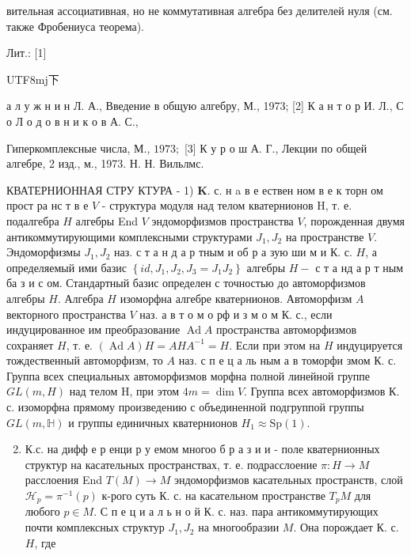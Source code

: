 \documentclass[10pt]{article}
\begin{document}
вительная ассоциативная, но не коммутативная алгебра без делителей нуля (см. также Фробениуса теорема).



Лит.: [1]\begin{CJK}{UTF8}{mj}下\end{CJK} а л у ж н и н Л. А., Введение в общую алгебру, М., 1973; [2] К а н т о р И. Л., С о Л о д о в н и к о в А. С.,

Гиперкомплексные числа, М., $1973 ;$ [3] К у р о ш А. Г., Лекции по общей алгебре, 2 изд., м., 1973. Н. Н. Вильлмс.



КВАТЕРНИОННАЯ СТРУ КТУРА - 1) $\boldsymbol{K}$. с. н a в е ествен ном в е к торн ом прост ра нс т в е $V$ - структура модуля над телом кватернионов $\mathrm{H}$, т. е. подалгебра $H$ алгебры End $V$ эндоморфизмов пространства $V$, порожденная двумя антикоммутирующими комплексными структурами $J_{1}, J_{2}$ на пространстве $V$. Эндоморфизмы $J_{1}, J_{2}$ наз. с т а н д а р тным и об р а зую ши м и К. с. $H$, а определяемый ими базис $\left\{i d, J_{1}, J_{2}, J_{3}=J_{1} J_{2}\right\}$ алгебры $H-$ с т а нд а р т ным ба з и с ом. Стандартный базис определен с точностью до автоморфизмов алгебры $H$. Алгебра $H$ изоморфна алгебре кватернионов. Автоморфизм $A$ векторного пространства $V$ наз. а в т о м о рф и з м о м К. с., если индуцированное им преобразование $\operatorname{Ad} A$ пространства автоморфизмов сохраняет $H$, т. е. $(\operatorname{Ad} A) H=A H A^{-1}=H$. Если при этом на $H$ индуцируется тождественный автоморфизм, то $A$ наз. с п е ц а ль ным а в томорфи змом К. с. Группа всех специальных автоморфизмов морфна полной линейной группе $G L(m, H)$ над телом H, при этом $4 m=\operatorname{dim} V$. Группа всех автоморфизмов К. с. изоморфна прямому произведению с объединенной подгруппой группы $G L(m, \mathbb{H})$ и группы единичных кватернионов $H_{1} \approx \mathrm{Sp}(1)$.



\begin{enumerate}

  \setcounter{enumi}{1}

  \item К.с. на дифф е р енци р у емом многоо б р а з и и - поле кватернионных структур на касательных пространствах, т. е. подрасслоение $\pi: H \rightarrow M$ расслоения End $T(M) \rightarrow M$ эндоморфизмов касательных пространств, слой $\mathscr{H}_{p}=\pi^{-1}(p)$ к-рого суть К. с. на касательном пространстве $T_{p} M$ для любого $p \in M$. С п е ц и а л ь н о й К. с. наз. пара антикоммутирующих почти комплексных структур $J_{1}, J_{2}$ на многообразии $M$. Она порождает К. с. $H$, где

\end{enumerate}
\end{document}
